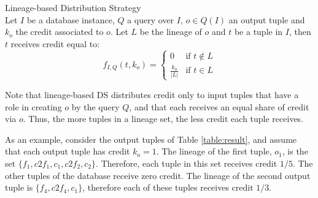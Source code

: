 \begin{definition}{Lineage-based Distribution Strategy}~\citep{dosso2020data}
    \label{def:lineage_ds}\\
    Let $I$ be a database instance, $Q$ a query over $I$, $o \in Q(I)$ an output tuple and $k_o$ the credit associated to $o$.
    Let $L$ be the lineage of $o$ and $t$ be a tuple in $I$, then $t$ receives credit equal to:
    \begin{equation*}
        f_{I, Q}(t, k_o) =  \begin{cases}
         0 & \mbox{if $t \notin L$} \\
            \frac{k_o}{|L|} & \mbox{if $t \in L$}
        \end{cases}
    \end{equation*}
\end{definition}

%

Note that lineage-based DS distributes credit only to input tuples that have a role in creating $o$ by the query $Q$, and that each receives an equal share of credit via $o$. Thus, the more tuples in a lineage set, the less credit each tuple receives. 


As an example, consider the output tuples of Table \ref{table:result}, and assume that each output tuple has credit $k_o = 1$.
The lineage of the first tuple, $o_1$, is the set $\{f_1, c2f_1, c_1, c2f_2, c_2\}$. Therefore, each tuple in this set receives credit $1/5$. The other tuples of the database receive zero credit.
The lineage of the second output tuple is $\{ f_4, c2f_4, c_1\}$, therefore each of these tuples receives credit $1/3$.

